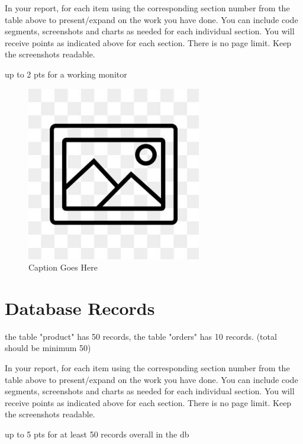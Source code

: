 \documentclass[12pt, letterpaper]{article}
\begin{document}
In your report, for each item using the corresponding section number from the table above to present/expand on the work you have done. You can include code segments, screenshots and charts as needed for each individual section. You will receive points as indicated above for each section. There is no page limit. Keep the screenshots readable.

up to 2 pts for a working monitor

\begin{figure}[htbp]
	\centering
	\includegraphics[width=3in]{images/placeholder.jpg}
	\caption{Caption Goes Here}
 \end{figure}

 \newpage

\section{Database Records}
the table "product" has 50 records, the table "orders" has 10 records. (total should be minimum 50)

In your report, for each item using the corresponding section number from the table above to present/expand on the work you have done. You can include code segments, screenshots and charts as needed for each individual section. You will receive points as indicated above for each section. There is no page limit. Keep the screenshots readable.

up to 5 pts for at least 50 records overall in the db
\end{document}
